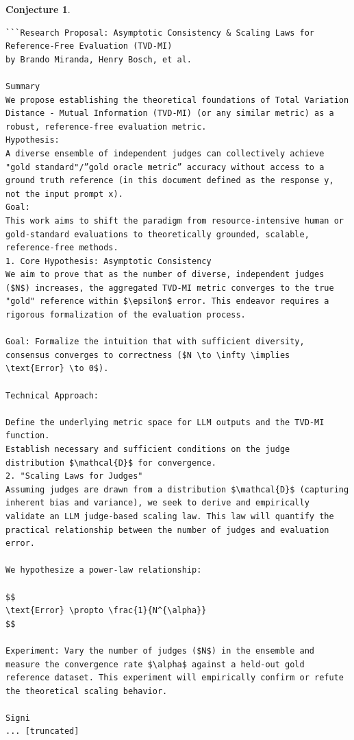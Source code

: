 \documentclass[11pt]{article}
\newtheorem{conjecture}{Conjecture}
\begin{document}
\begin{conjecture}
\begin{lstlisting}
```Research Proposal: Asymptotic Consistency & Scaling Laws for Reference-Free Evaluation (TVD-MI)
by Brando Miranda, Henry Bosch, et al.

Summary
We propose establishing the theoretical foundations of Total Variation Distance - Mutual Information (TVD-MI) (or any similar metric) as a robust, reference-free evaluation metric.
Hypothesis:
A diverse ensemble of independent judges can collectively achieve "gold standard"/”gold oracle metric” accuracy without access to a ground truth reference (in this document defined as the response y, not the input prompt x).
Goal:
This work aims to shift the paradigm from resource-intensive human or gold-standard evaluations to theoretically grounded, scalable, reference-free methods.
1. Core Hypothesis: Asymptotic Consistency
We aim to prove that as the number of diverse, independent judges ($N$) increases, the aggregated TVD-MI metric converges to the true "gold" reference within $\epsilon$ error. This endeavor requires a rigorous formalization of the evaluation process.

Goal: Formalize the intuition that with sufficient diversity, consensus converges to correctness ($N \to \infty \implies \text{Error} \to 0$).

Technical Approach:

Define the underlying metric space for LLM outputs and the TVD-MI function.
Establish necessary and sufficient conditions on the judge distribution $\mathcal{D}$ for convergence.
2. "Scaling Laws for Judges"
Assuming judges are drawn from a distribution $\mathcal{D}$ (capturing inherent bias and variance), we seek to derive and empirically validate an LLM judge-based scaling law. This law will quantify the practical relationship between the number of judges and evaluation error.

We hypothesize a power-law relationship:

$$
\text{Error} \propto \frac{1}{N^{\alpha}}
$$

Experiment: Vary the number of judges ($N$) in the ensemble and measure the convergence rate $\alpha$ against a held-out gold reference dataset. This experiment will empirically confirm or refute the theoretical scaling behavior.

Signi
... [truncated]
\end{lstlisting}
\end{conjecture}
\end{document}

